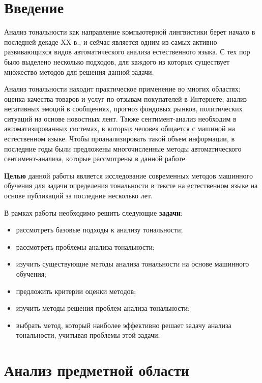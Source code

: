 \documentclass[a4paper,14pt, unknownkeysallowed]{extreport}
\begin{document}
	
\renewcommand{\contentsname}{Содержание} %
\tableofcontents
\setcounter{page}{3}

\chapter*{Введение}

Анализ тональности как направление компьютерной лингвистики берет начало в последней декаде XX в., и сейчас является одним из самых активно развивающихся видов автоматического анализа естественного языка. С тех пор было выделено несколько подходов, для каждого из которых существует множество методов для решения данной задачи.

Анализ тональности находит практическое применение во многих областях: оценка качества товаров и услуг по отзывам покупателей в Интернете, анализ негативных эмоций в сообщениях, прогноз фондовых рынков, политических ситуаций на основе новостных лент. Также сентимент-анализ необходим в автоматизированных системах, в которых человек общается с машиной на естественном языке. Чтобы проанализировать такой объем информации, в последние годы были предложены многочисленные методы автоматического сентимент-анализа, которые рассмотрены в данной работе.

\textbf{Целью} данной работы является исследование современных методов машинного обучения для задачи определения тональности в тексте на естественном языке на основе публикаций за последние несколько лет.

В рамках работы необходимо решить следующие \textbf{задачи}:
\begin{itemize}
	\item рассмотреть базовые подходы к анализу тональности;
	\item рассмотреть проблемы анализа тональности;
	\item изучить существующие методы анализа тональности на основе машинного обучения;
	\item предложить критерии оценки методов;
	\item изучить методы решения проблем анализа тональности;
	\item выбрать метод, который наиболее эффективно решает задачу анализа тональности, учитывая проблемы этой задачи.
\end{itemize}

\chapter{Анализ предметной области}
\end{document}
